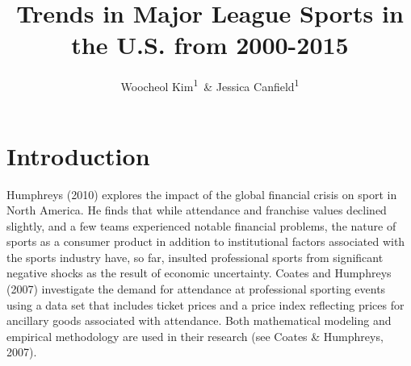\documentclass[man, fleqn, noextraspace,floatsintext]{apa6}
\title{Trends in Major League Sports in the U.S. from 2000-2015}
\author{Woocheol Kim\textsuperscript{1}~\& Jessica Canfield\textsuperscript{1}}
\date{}
\affiliation{
\vspace{0.5cm}
\textsuperscript{1} University of Oregon}
\begin{document}
\maketitle

\hypertarget{introduction}{%
\section{Introduction}\label{introduction}}

Humphreys (2010) explores the impact of the global financial crisis on sport in North America. He finds that while attendance and franchise values declined slightly, and a few teams experienced notable financial problems, the nature of sports as a consumer product in addition to institutional factors associated with the sports industry have, so far, insulted professional sports from significant negative shocks as the result of economic uncertainty. Coates and Humphreys (2007) investigate the demand for attendance at professional sporting events using a data set that includes ticket prices and a price index reflecting prices for ancillary goods associated with attendance. Both mathematical modeling and empirical methodology are used in their research (see Coates \& Humphreys, 2007).
\end{document}
